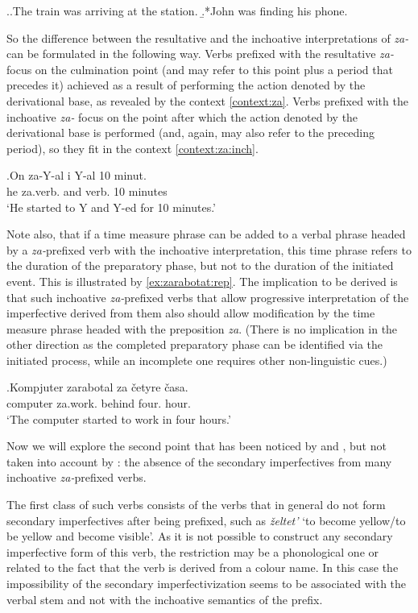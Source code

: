 \ex.\a.\label{ex:achiev:1}The train was arriving at the station.
\b.*John was finding his phone.\label{ex:achiev:2}

So the difference between the resultative and the inchoative interpretations of \textit{za-} can be formulated in the following way. Verbs prefixed with the resultative \textit{za-} focus on the culmination point (and may refer to this point plus a period that precedes it) achieved as a result of performing the action denoted by the derivational base, as revealed by the context \ref{context:za}. Verbs prefixed with the inchoative \textit{za-} focus on the point after which the action denoted by the derivational base is performed (and, again, may also refer to the preceding period), so they fit in the context \ref{context:za:inch}.

\exg.\label{context:za:inch}On za-Y-al i Y-al 10 minut.\\
he za.verb. and verb. 10 minutes\\
\trans `He started to Y and Y-ed for 10 minutes.'

Note also, that if a time measure phrase can be added to a verbal phrase headed by a \textit{za-}prefixed verb with the inchoative interpretation, this time phrase refers to the duration of the preparatory phase, but not to the duration of the initiated event. This is illustrated by \ref{ex:zarabotat:rep}. The implication to be derived is that such inchoative \textit{za-}prefixed verbs that allow progressive interpretation of the imperfective derived from them also should allow modification by the time measure phrase headed with the preposition \textit{za}. (There is no implication in the other direction as the completed preparatory phase can be identified via the initiated process, while an incomplete one requires other non-linguistic cues.)

\exg.\label{ex:zarabotat:rep}Kompjuter zarabotal za \v{c}etyre \v{c}asa.\\
computer za.work. behind four. hour.\\
\trans `The computer started to work in four hours.'

Now we will explore the second point that has been noticed by \citet{Svenonius:04b} and \citet{Braginsky:08}, but not taken into account by \citet{Tatevosov:09}: the absence of the secondary imperfectives from many inchoative \textit{za-}prefixed verbs. 

The first class of such verbs consists of the verbs that in general do not form secondary imperfectives after being prefixed, such as \textit{\v{z}eltet'} `to become yellow/to be yellow and become visible'. As it is not possible to construct any secondary imperfective form of this verb, the restriction may be a phonological one or related to the fact that the verb is derived from a colour name. In this case the impossibility of the secondary imperfectivization seems to be associated with the verbal stem and not with the inchoative semantics of the prefix. 

